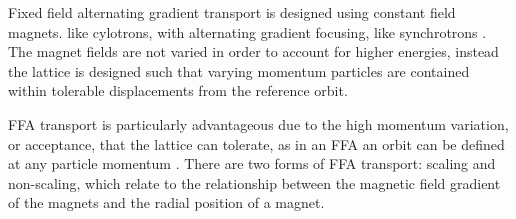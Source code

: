 \documentclass[../main.tex]{subfiles}
\begin{document}
Fixed field alternating gradient transport is designed using constant field magnets. like cylotrons, with alternating gradient focusing, like synchrotrons \cite{machida2013fixed}. The magnet fields are not varied in order to account for higher energies, instead the lattice is designed such that varying momentum particles are contained within tolerable displacements from the reference orbit. 

FFA transport is particularly advantageous due to the high momentum variation, or acceptance, that the lattice can tolerate, as in an FFA an orbit can be defined at any particle momentum \cite{barlow2010emma}. There are two forms of FFA transport: scaling and non-scaling, which relate to the relationship between the magnetic field gradient of the magnets and the radial position of a magnet.
\end{document}
